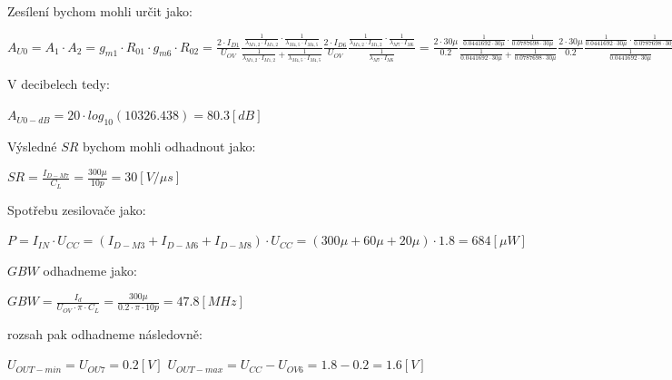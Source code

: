 Zesílení bychom mohli určit jako:
\begin{center}
    \Large
    \(
        A_{U0} = A_{1} \cdot A_{2} = 
         g_{m1} \cdot R_{01} \cdot g_{m6} \cdot R_{02} =  
        \frac{2 \cdot I_{D1}}{U_{OV}} \frac{\frac{1}{\lambda_{M1,2} \cdot I_{M1,2}} \cdot \frac{1}{\lambda_{M4,5} \cdot I_{M4,5}}}{\frac{1}{\lambda_{M1,2} \cdot I_{M1,2}} + \frac{1}{\lambda_{M4,5} \cdot I_{M4,5}}}  \frac{2 \cdot I_{D6}}{U_{OV}} \frac{\frac{1}{\lambda_{M1,2} \cdot I_{M1,2}} \cdot \frac{1}{\lambda_{M7} \cdot I_{M6}}}{\frac{1}{\lambda_{M7} \cdot I_{M6}}} = 
        \frac{2 \cdot 30\mu }{0.2   } \frac{\frac{1}{0.0441692      \cdot 30\mu   } \cdot \frac{1}{0.0787698      \cdot 30\mu   }}{\frac{1}{0.0441692      \cdot 30\mu   } + \frac{1}{0.0787698      \cdot 30\mu   }}  \frac{2 \cdot 30\mu }{0.2   } \frac{\frac{1}{0.0441692      \cdot 30\mu   } \cdot \frac{1}{0.0787698    \cdot 30\mu }}{\frac{1}{0.0441692    \cdot 30\mu }} = 
        10326.438
    \)
\end{center}
V decibelech tedy:
\begin{center}
    \Large
    \(
        A_{U0-dB} = 20 \cdot log_{10}(10326.438) = 80.3 [dB]
    \)
\end{center}

Výsledné \(SR\) bychom mohli odhadnout jako:
\begin{center}
    \Large
    \(
        SR = \frac{I_{D-M7}}{C_L} = \frac{300\mu}{10p} = 30 [V/\mu s]
    \)
\end{center}

Spotřebu zesilovače jako:
\begin{center}
    \large
    \(
        P = I_{IN} \cdot U_{CC} = (I_{D-M3} + I_{D-M6} + I_{D-M8}) \cdot U_{CC} = (300\mu + 60\mu + 20\mu) \cdot 1.8 = 684 [\mu W]
    \)
\end{center}

\(GBW\) odhadneme jako:
\begin{center}
    \Large
    \(
        GBW = \frac{I_d}{U_{OV} \cdot \pi \cdot C_L} = \frac{300\mu}{0.2 \cdot \pi \cdot 10p} = 47.8 [MHz]  
    \)
\end{center}

 rozsah pak odhadneme následovně:
\begin{center}
    \large
    \(
        U_{OUT-min} = U_{OU7} = 0.2 [V] 
    \)
    \(
        U_{OUT-max} = U_{CC} - U_{OV6} = 1.8 - 0.2 = 1.6 [V]
    \)
\end{center}


